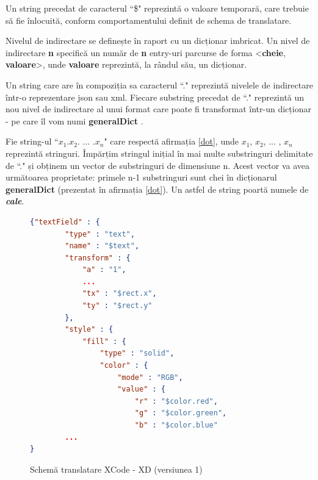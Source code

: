 \begin{mydef}\label{dollar}
Un string precedat de caracterul ``\$" reprezintă o valoare temporară, care trebuie să fie înlocuită, conform comportamentului definit de schema de translatare.\\
\end{mydef}


\begin{mydef}\label{nivel}
Nivelul de indirectare se definește în raport cu un dicționar imbricat. Un nivel de indirectare \textbf{n} specifică un număr de \textbf{n} entry-uri parcurse de forma <\textbf{cheie}, \textbf{valoare}>, unde \textbf{valoare} reprezintă, la rândul său, un dicționar.\\
\end{mydef}


\begin{mydef}\label{dot}
Un string care are în compoziția sa caracterul ``." reprezintă nivelele de indirectare într-o reprezentare json sau xml. Fiecare substring precedat de ``." reprezintă un nou nivel de indirectare al unui format care poate fi transformat într-un dicționar - pe care îl vom numi \textbf{generalDict} .\\
\end{mydef}


\begin{mydef}\label{count}
Fie string-ul ``$x_1$.$x_2$. ... .$x_n$" care respectă afirmația \ref{dot}, unde $x_1$, $x_2$, ... , $x_n$ reprezintă stringuri. Împărțim stringul inițial în mai multe substringuri delimitate de ``." și obținem un vector de substringuri de dimensiune n. Acest vector va avea următoarea proprietate: primele n-1 substringuri sunt chei în dicționarul \textbf{generalDict} (prezentat în afirmația \ref{dot}). Un astfel de string poartă numele de \textbf{\textit{cale}}. \\
\end{mydef}


\begin{figure}[!htbp]
\begin{lstlisting}[language=json,firstnumber=1]
{"textField" : {
        "type" : "text",
        "name" : "$text",
        "transform" : {
            "a" : "1",
            ...
            "tx" : "$rect.x",
            "ty" : "$rect.y"
        },
        "style" : {
            "fill" : {
                "type" : "solid",
                "color" : {
                    "mode" : "RGB",
                    "value" : {
                        "r" : "$color.red",
                        "g" : "$color.green",
                        "b" : "$color.blue"
        ...
}

\end{lstlisting}
\caption{Schemă translatare XCode - XD (versiunea 1)} \label{fig:XCode2XD Schema}
\end{figure}

